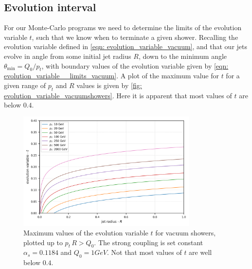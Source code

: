 \documentclass[main.tex]{subfiles}
\begin{document}
\subsection{Evolution interval }\label{sec: determining_evolution_time_from_sudakov}
For our Monte-Carlo programs we need to determine the limits of the evolution variable \(t\), such that we know when to terminate a given shower. Recalling the evolution variable defined in \autoref{eqn: evolution_variable_vacuum}, and that our jets evolve in angle from some initial jet radius \(R\), down to the minimum angle \(\theta_{\text{min}} = Q_0/p_t\), with boundary values of the evolution variable given by \autoref{eqn: evolution_variable__limits_vacuum}. A plot of the maximum value for \(t\) for a given range of \(p_t\) and \(R\) values is given by \autoref{fig: evolution_variable_vacuumshowers}. Here it is apparent that most values of \(t\) are below \(0.4\).
\begin{figure}[htb]
    \centering
    \includegraphics[width=9cm]{pictures/plots/misc/evolution_variable_vacuumshowers.png}
    \caption{Maximum values of the evolution variable \(t\) for vacuum showers, plotted up to \(p_t\,R > Q_0\). The strong coupling is set constant \(\alpha_s = 0.1184\) and \(Q_0 = 1 GeV\). Not that most values of \(t\) are well below \(0.4\). }
    \label{fig: evolution_variable_vacuumshowers}
\end{figure}
\end{document}
